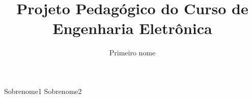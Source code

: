 \documentclass[undgrad,numbers]{Controle/DES}
\begin{document}
  \title{Projeto Pedagógico do Curso de Engenharia Eletrônica} %
  \author{Primeiro nome}{Sobrenome1 Sobrenome2} %

  \newcommand{\exinsto}{Universidade Federal de Pernambuco} %

  \newcommand{\exinstum}{Universidade Federal de Pernambuco} %

  \newcommand{\exinstdois}{Universidade Federal de Pernambuco} %


  \date{\the\month}{\the\year}

  \newcommand{\Datadadefesa}{xx/xx/20xx}%

  \mainmatter


\cleardoublepage
\begingroup
  \makeatletter
  \let\ps@plain\ps@empty
  \makeatother

  \pagestyle{empty}
  \tableofcontents
  \listoffigures %
  \listoftables %
  \cleardoublepage

\endgroup

  \pagestyle{plain}
  \backmatter
  
  
\end{document}

